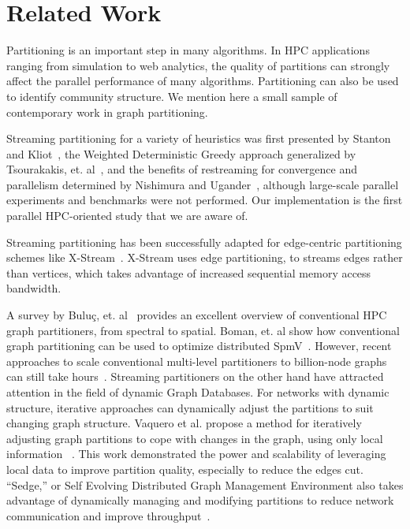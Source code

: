 \section{Related Work} \label{sec:rel}
Partitioning is an important step in many algorithms. In HPC applications ranging from simulation to web analytics, the quality of partitions can strongly affect the parallel performance of many algorithms. Partitioning can also be used to identify community structure. We mention here a small sample of contemporary work in graph partitioning.

Streaming partitioning for a variety of heuristics was first presented by Stanton and Kliot~\cite{Stanton:2012:SGP:2339530.2339722}, the Weighted Deterministic Greedy approach generalized by Tsourakakis, et. al~\cite{tsourakakis2012fennel}, and the benefits of restreaming for convergence and parallelism determined by Nishimura and Ugander~\cite{nishimura2013restream}, although large-scale parallel experiments and benchmarks were not performed. Our implementation is the first parallel HPC-oriented study that we are aware of. 

Streaming partitioning has been successfully adapted for edge-centric partitioning schemes like X-Stream~\cite{xstream}.
X-Stream uses edge partitioning, to streams edges rather than vertices, which takes advantage of increased sequential memory access bandwidth.

A survey by Bulu\c{c}, et. al~\cite{gpsurvey} provides an excellent overview of conventional HPC graph partitioners, from spectral to spatial. Boman, et. al show how conventional graph partitioning can be used to optimize distributed SpmV~\cite{Bomansc13}. However, recent approaches to scale conventional multi-level partitioners to billion-node graphs can still take hours~\cite{billion}. Streaming partitioners on the other hand have attracted attention in the field of dynamic Graph Databases. For networks with dynamic structure, iterative approaches can dynamically adjust the partitions to suit changing graph structure. Vaquero et al. propose a method for iteratively adjusting graph partitions to cope with changes in the graph, using only local information ~\cite{Vaquero:2013:APL:2523616.2525943}. This work demonstrated the power and scalability of leveraging local data to improve partition quality, especially to reduce the edges cut. ``Sedge,'' or Self Evolving Distributed Graph Management Environment also takes advantage of dynamically managing and modifying partitions to reduce network communication and improve throughput~\cite{Yangpart}.

